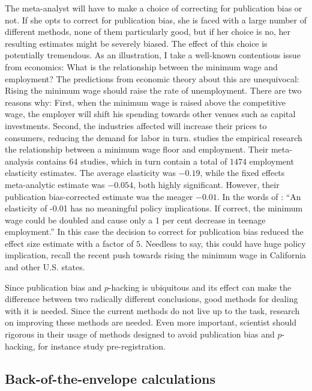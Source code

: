 The meta-analyst will have to make a choice of correcting for publication
bias or not. If she opts to correct for publication bias, she is faced
with a large number of different methods, none of them particularly
good, but if her choice is no, her resulting estimates might be severely
biased. The effect of this choice is potentially tremendous. As an
illustration, I take a well-known contentious issue from economics:
What is the relationship between the minimum wage and employment?
The predictions from economic theory about this are unequivocal: Rising
the minimum wage should raise the rate of unemployment. There are
two reasons why: First, when the minimum wage is raised above the
competitive wage, the employer will shift his spending towards other
venues such as capital investments. Second, the industries affected
will increase their prices to consumers, reducing the demand for labor
in turn. \cite{doucouliagos_publication_2009} studies the empirical
research the relationship between a minimum wage floor and employment.
Their meta-analysis contains $64$ studies, which in turn contain
a total of $1474$ employment elasticity estimates. The average elasticity
was $-0.19$, while the fixed effects meta-analytic estimate was $-0.054$,
both highly significant. However, their publication bias-corrected
estimate was the meager $-0.01$. In the words of \cite{doucouliagos_publication_2009}:
``An elasticity of -0.01 has no meaningful policy implications. If
correct, the minimum wage could be doubled and cause only a 1 per
cent decrease in teenage employment.'' In this case the decision
to correct for publication bias reduced the effect size estimate with
a factor of $5$. Needless to say, this could have huge policy implication,
recall the recent push towards rising the minimum wage in California
and other U.S. states.

Since publication bias and $p$-hacking is ubiquitous and its effect
can make the difference between two radically different conclusions,
good methods for dealing with it is needed. Since the current methods
do not live up to the task, research on improving these methods are
needed. Even more important, scientist should rigorous in their usage
of methods designed to avoid publication bias and $p$-hacking, for
instance study pre-registration. 

\subsection{Back-of-the-envelope calculations }

